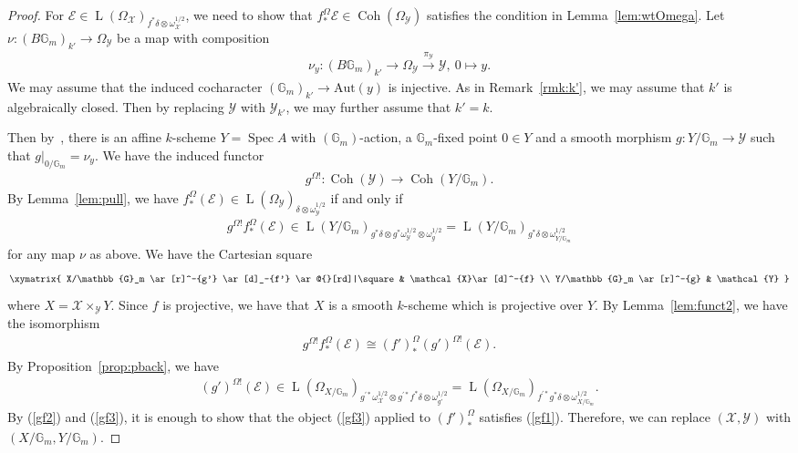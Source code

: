 \documentclass [11pt,oneside,a4paper,mathscr]{amsart}
\makeatletter
\theoremstyle{definition}
\newcommand{\Y}{\mathcal{Y}}
\newcommand{\LL}{\operatorname{L}}
\newcommand{\X}{\mathcal{X}}
\newcommand{\bgm}{B\mathbb{G}_m}
\newcommand{\diasquare}{\ar@{}[rd]|\square}
\newcommand{\Coh}{\operatorname{Coh}}
\newcommand{\Spec}{\operatorname{Spec}}
\makeatother
\begin{document}
\begin{proof}
    For $\mathcal{E} \in \LL(\Omega_{\X})_{f^{\ast}\delta \otimes \omega_{\X}^{1/2}}$, 
    we need to show that $f^{\Omega}_{\ast}\mathcal{E} \in \Coh(\Omega_{\Y})$ 
    satisfies the condition in Lemma~\ref{lem:wtOmega}.
    Let $\nu \colon (\bgm)_{k'} \to \Omega_{\Y}$ be a map 
    with composition
    \begin{align*}
      \nu_y \colon (\bgm)_{k'} \to \Omega_{\Y} \stackrel{\pi_{\Y}}{\to} \Y, \ 
      0 \mapsto y. 
    \end{align*}
    We may assume that the induced cocharacter $(\mathbb{G}_m)_{k'} \to \mathrm{Aut}(y)$ is injective. As in Remark~\ref{rmk:k'}, we may assume that $k'$ is 
    algebraically closed. Then by replacing $\Y$ with $\Y_{k'}$, we may further assume that $k'=k$. 
    
    Then by~\cite[Theorem~1.1]{AHRLuna}, there is an affine $k$-scheme $Y=\Spec A$ with 
    $(\mathbb{G}_m)$-action, 
    a $\mathbb{G}_m$-fixed point $0 \in Y$ and a smooth morphism 
    $g \colon Y/\mathbb{G}_m \to \Y$ such that $g|_{0/\mathbb{G}_m}=\nu_y$. 
We have the induced functor 
\begin{align*}
    g^{\Omega!} \colon \Coh(\Y) \to \Coh(Y/\mathbb{G}_m). 
\end{align*}
    By Lemma~\ref{lem:pull}, we have 
    $f^{\Omega}_{\ast}(\mathcal{E}) \in \LL(\Omega_{\Y})_{\delta \otimes \omega_{\Y}^{1/2}}$ if 
    and only if 
    \begin{align}\label{gf1}
    g^{\Omega!}f^{\Omega}_{\ast}(\mathcal{E})
    \in \LL(Y/\mathbb{G}_m)_{g^{\ast}\delta \otimes g^{\ast}\omega_{\Y}^{1/2} \otimes \omega_g^{1/2}}
    = \LL(Y/\mathbb{G}_m)_{g^*\delta\otimes\omega_{Y/\mathbb{G}_m}^{1/2}}
    \end{align}
    for any map $\nu$ as above. We have the Cartesian square 
    \begin{align*}
        \xymatrix{
X/\mathbb{G}_m \ar[r]^-{g'} \ar[d]_-{f'} \diasquare& \X \ar[d]^-{f} \\
Y/\mathbb{G}_m \ar[r]^-{g} & \Y        
        }
    \end{align*}
    where $X=\X\times_{\Y}Y$. Since $f$ is projective, 
    we have that $X$ is a smooth $k$-scheme which is projective over $Y$. 
    By Lemma~\ref{lem:funct2}, we have the isomorphism
    \begin{align}\label{gf2}
       g^{\Omega!}f^{\Omega}_{\ast}(\mathcal{E})
       \cong (f')^{\Omega}_{\ast} (g')^{\Omega!}(\mathcal{E}). 
    \end{align}
    By Proposition~\ref{prop:pback}, we have 
    \begin{align}\label{gf3}
        (g')^{\Omega!}(\mathcal{E}) \in \LL(\Omega_{X/\mathbb{G}_m})_{g^{'\ast}\omega_{\X}^{1/2}\otimes g^{'\ast}f^*\delta\otimes\omega_{g'}^{1/2}}=\LL(\Omega_{X/\mathbb{G}_m})_{f^{'\ast}g^*\delta\otimes\omega_{X/\mathbb{G}_m}^{1/2}}.
    \end{align}
By (\ref{gf2}) and (\ref{gf3}), it is enough to show that 
the object (\ref{gf3}) applied to $(f')^{\Omega}_{*}$ satisfies (\ref{gf1}). 
    Therefore, we can replace 
$(\X, \Y)$ with $(X/\mathbb{G}_m, Y/\mathbb{G}_m)$. 


\end{proof}
\end{document}
